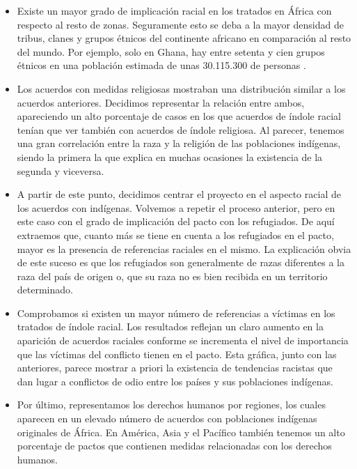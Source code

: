 \documentclass[11pt]{article}
\begin{document}
\begin{itemize}
    \item Existe un mayor grado de implicación racial en los tratados en África con respecto al resto de zonas. Seguramente esto se deba a la mayor densidad de tribus, clanes y grupos étnicos del continente africano en comparación al resto del mundo. Por ejemplo, solo en Ghana, hay entre setenta y cien grupos étnicos en una población estimada de unas 30.115.300 de personas \cite{ghana}.
    
    \item Los acuerdos con medidas religiosas mostraban una distribución similar a los acuerdos anteriores. Decidimos representar la relación entre ambos, apareciendo un alto porcentaje de casos en los que acuerdos de índole racial tenían que ver también con acuerdos de índole religiosa. Al parecer, tenemos una gran correlación entre la raza y la religión de las poblaciones indígenas, siendo la primera la que explica en muchas ocasiones la existencia de la segunda y viceversa.
    
    \item A partir de este punto, decidimos centrar el proyecto en el aspecto racial de los acuerdos con indígenas. Volvemos a repetir el proceso anterior, pero en este caso con el grado de implicación del pacto con los refugiados. De aquí extraemos que, cuanto más se tiene en cuenta a los refugiados en el pacto, mayor es la presencia de referencias raciales en el mismo. La explicación obvia de este suceso es que los refugiados son generalmente de razas diferentes a la raza del país de origen o, que su raza no es bien recibida en un territorio determinado.
    
    \item Comprobamos si existen un mayor número de referencias a víctimas en los tratados de índole racial. Los resultados reflejan un claro aumento en la aparición de acuerdos raciales conforme se incrementa el nivel de importancia que las víctimas del conflicto tienen en el pacto. Esta gráfica, junto con las anteriores, parece mostrar a priori la existencia de tendencias racistas que dan lugar a conflictos de odio entre los países y sus poblaciones indígenas.
    
    \item Por último, representamos los derechos humanos por regiones, los cuales aparecen en un elevado número de acuerdos con poblaciones indígenas originales de África. En América, Asia y el Pacífico también tenemos un alto porcentaje de pactos que contienen medidas relacionadas con los derechos humanos.
    
\end{itemize}
\end{document}
